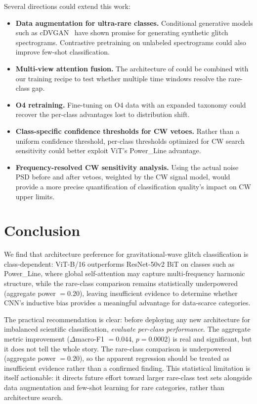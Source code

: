 \documentclass[12pt]{article}
\newcommand{\pvalueOverall}{0.0002}
\newcommand{\diffOverall}{0.044}
\begin{document}
Several directions could extend this work:
\begin{itemize}
  \item \textbf{Data augmentation for ultra-rare classes.}
    Conditional generative models such as cDVGAN~\citep{Lopez2024} have shown
    promise for generating synthetic glitch spectrograms.
    Contrastive pretraining on unlabeled spectrograms could also improve
    few-shot classification.
  \item \textbf{Multi-view attention fusion.}
    The architecture of \citet{Wu2024} could be combined with our training
    recipe to test whether multiple time windows resolve the rare-class gap.
  \item \textbf{O4 retraining.}
    Fine-tuning on O4 data with an expanded taxonomy could recover the per-class
    advantages lost to distribution shift.
  \item \textbf{Class-specific confidence thresholds for CW vetoes.}
    Rather than a uniform confidence threshold, per-class thresholds
    optimized for CW search sensitivity could better exploit ViT's
    Power\_Line advantage.
  \item \textbf{Frequency-resolved CW sensitivity analysis.}
    Using the actual noise PSD before and after vetoes, weighted by the CW
    signal model, would provide a more precise quantification of classification
    quality's impact on CW upper limits.
\end{itemize}


\section{Conclusion}
\label{sec:conclusion}

We find that architecture preference for gravitational-wave glitch
classification is class-dependent: ViT-B/16 outperforms ResNet-50v2 BiT on
classes such as Power\_Line, where global self-attention may capture
multi-frequency harmonic structure, while
the rare-class comparison remains statistically underpowered (aggregate power $= 0.20$), leaving insufficient evidence to determine whether CNN's inductive bias provides a meaningful advantage for data-scarce categories.

The practical recommendation is clear: before deploying any new architecture
for imbalanced scientific classification, \emph{evaluate per-class performance}.
The aggregate metric improvement ($\Delta$macro-F1 $= \diffOverall$,
$p = \pvalueOverall$) is real and significant, but it does not tell the
whole story.
The rare-class comparison is underpowered (aggregate power $= 0.20$), so the
apparent regression should be treated as insufficient evidence rather than a
confirmed finding.
This statistical limitation is itself actionable: it directs future effort
toward larger rare-class test sets alongside data augmentation and few-shot
learning for rare categories, rather than architecture search.
\end{document}
